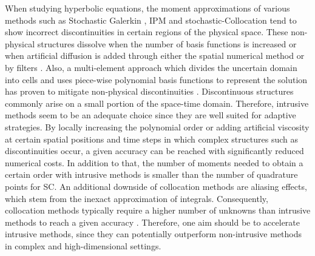 When studying hyperbolic equations, the moment approximations of various methods such as Stochastic Galerkin \cite{le2004uncertainty}, IPM \cite{kusch2018filtered} and stochastic-Collocation \cite{barth2013non,dwight2013adaptive} tend to show incorrect discontinuities in certain regions of the physical space. These non-physical structures dissolve when the number of basis functions is increased \cite{pettersson2009numerical,offner2017stability} or when artificial diffusion is added through either the spatial numerical method \cite{offner2017stability} or by filters \cite{kusch2018filtered}. Also, a multi-element approach which divides the uncertain domain into cells and uses piece-wise polynomial basis functions to represent the solution has proven to mitigate non-physical discontinuities \cite{wan2006multi,durrwachter2018hyperbolicity}. Discontinuous structures commonly arise on a small portion of the space-time domain. Therefore, intrusive methods seem to be an adequate choice since they are well suited for adaptive strategies. By locally increasing the polynomial order \cite{tryoen2012adaptive,kroker2012finite,giesselmann2017posteriori} or adding artificial viscosity \cite{kusch2018filtered} at certain spatial positions and time steps in which complex structures such as discontinuities occur, a given accuracy can be reached with significantly reduced numerical costs. In addition to that, the number of moments needed to obtain a certain order with intrusive methods is smaller than the number of quadrature points for SC. An additional downside of collocation methods are aliasing effects, which stem from the inexact approximation of integrals. Consequently, collocation methods typically require a higher number of unknowns than intrusive methods to reach a given accuracy \cite{xiu2009fast,alekseev2011estimation}. Therefore, one aim should be to accelerate intrusive methods, since they can potentially outperform non-intrusive methods in complex and high-dimensional settings. \\

